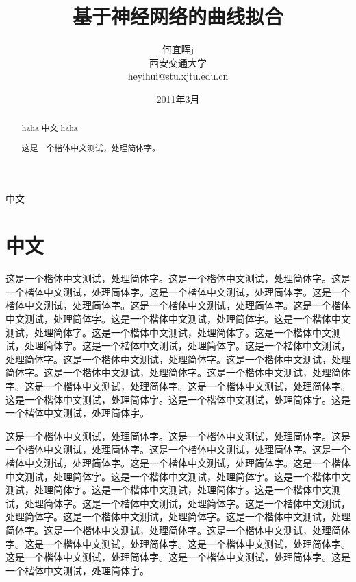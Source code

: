 \documentclass[]{article}
\date{2011年3月}
\title{基于神经网络的曲线拟合}
\author{何宜晖j\\西安交通大学\\heyihui@stu.xjtu.edu.cn}
\begin{document}
\begin{CJK}{UTF8}{gkai}
\maketitle

\begin{abstract}
haha 中文 haha

	这是一个楷体中文测试，处理简体字。

\end{abstract}
中文
\section{中文}

	这是一个楷体中文测试，处理简体字。这是一个楷体中文测试，处理简体字。这是一个楷体中文测试，处理简体字。这是一个楷体中文测试，处理简体字。这是一个楷体中文测试，处理简体字。这是一个楷体中文测试，处理简体字。这是一个楷体中文测试，处理简体字。这是一个楷体中文测试，处理简体字。这是一个楷体中文测试，处理简体字。这是一个楷体中文测试，处理简体字。这是一个楷体中文测试，处理简体字。这是一个楷体中文测试，处理简体字。这是一个楷体中文测试，处理简体字。这是一个楷体中文测试，处理简体字。这是一个楷体中文测试，处理简体字。这是一个楷体中文测试，处理简体字。这是一个楷体中文测试，处理简体字。这是一个楷体中文测试，处理简体字。这是一个楷体中文测试，处理简体字。这是一个楷体中文测试，处理简体字。这是一个楷体中文测试，处理简体字。这是一个楷体中文测试，处理简体字。

	这是一个楷体中文测试，处理简体字。这是一个楷体中文测试，处理简体字。这是一个楷体中文测试，处理简体字。这是一个楷体中文测试，处理简体字。这是一个楷体中文测试，处理简体字。这是一个楷体中文测试，处理简体字。这是一个楷体中文测试，处理简体字。这是一个楷体中文测试，处理简体字。这是一个楷体中文测试，处理简体字。这是一个楷体中文测试，处理简体字。这是一个楷体中文测试，处理简体字。这是一个楷体中文测试，处理简体字。这是一个楷体中文测试，处理简体字。这是一个楷体中文测试，处理简体字。这是一个楷体中文测试，处理简体字。这是一个楷体中文测试，处理简体字。这是一个楷体中文测试，处理简体字。这是一个楷体中文测试，处理简体字。这是一个楷体中文测试，处理简体字。这是一个楷体中文测试，处理简体字。这是一个楷体中文测试，处理简体字。这是一个楷体中文测试，处理简体字。

\end{CJK}
\end{document}
